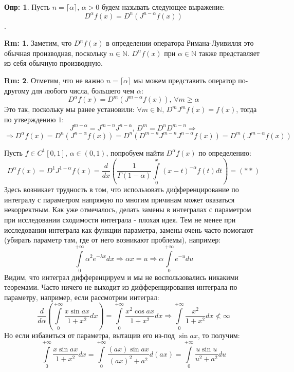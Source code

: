 \documentclass[12pt]{article}
\newcommand{\MN}{\mathbb{N}}
\theoremstyle{definition}
\newtheorem{defn}{Опр:}
\newtheorem{rem}{Rm:}
\newcommand{\ddint}[2]{\displaystyle\int\limits_{#1}^{#2}}
\begin{document}
\begin{defn}
	Пусть $n = \lceil \alpha \rceil, \, \alpha > 0$ будем называть следующее выражение:
	$$
		D^{\alpha}f(x) = D^n \left(J^{n - \alpha}f(x)\right)
	$$ 
	.
\end{defn}
\begin{rem}
	Заметим, что $D^n f(x)$ в определении оператора Римана-Луивилля это обычная производная, поскольку $n \in \MN$. $D^\alpha f(x)$ при $\alpha \in \MN$ также представляет из себя обычную производную.
\end{rem}
\begin{rem}
	Отметим, что не важно $n = \lceil \alpha \rceil$ мы можем представить оператор по-другому для любого числа, большего чем $\alpha$: 
	$$
		D^{\alpha}f(x) = D^{m}\left(J^{m - \alpha}f(x)\right), \, \forall m \geq \alpha
	$$
	Это так, поскольку мы ранее установили: $\forall m \in \MN,\, D^mJ^mf(x) = f(x)$, тогда по утверждению $1$:
	$$
		J^{m -\alpha} = J^{m -n }J^{n - \alpha}, \, D^{m} = D^{n}D^{m - n} \Rightarrow 
	$$
	$$
		\Rightarrow D^{\alpha}f(x) = D^n \left(J^{n - \alpha}f(x)\right) = D^{n}\left(D^{m -n}J^{m-n}J^{n-\alpha}f(x)\right) = D^{m}\left(J^{m - \alpha}f(x)\right)
	$$
\end{rem}
Пусть $f \in C^1[0,1], \, \alpha \in (0,1)$, попробуем найти $D^{\alpha}f(x)$ по определению:
$$
	D^{\alpha}f(x) = D^{1}J^{1 - \alpha}f(x) = \dfrac{d}{dx}\left(\dfrac{1}{\Gamma(1- \alpha)} \ddint{0}{x}(x-t)^{-\alpha}f(t)dt\right) =(**)
$$
Здесь возникает трудность в том, что использовать дифференцирование по интегралу с параметром напрямую по многим причинам может оказаться некорректным. Как уже отмечалось, делать замены в интегралах с параметром при исследовании сходимости интеграла - плохая идея. Тем не менее при исследовании интеграла как функции параметра, замены очень часто помогают (убирать параметр там, где от него возникают проблемы), например:
$$
	\ddint{0}{+\infty}\alpha^2 e^{-\lambda x} dx \Rightarrow \alpha x = u \Rightarrow \alpha \ddint{0}{+\infty} e^{-u} du
$$
Видим, что интеграл дифференцируем и мы не воспользовались никакими теоремами. Часто ничего не выходит из дифференцирования интеграла по параметру, например, если рассмотрим интеграл:
$$
	\dfrac{d}{d \alpha}\left(\ddint{0}{+\infty}\dfrac{x\sin{ax}}{1 + x^2}dx\right) = \ddint{0}{+\infty}\dfrac{x^2 \cos{ax}}{1 + x^2}dx \Rightarrow \ddint{0}{+\infty}\dfrac{x^2}{1 + x^2}dx  \not< \infty
$$
Но если избавиться от параметра, вытащив его из-под $\sin{ax}$, то получим:
$$
	\ddint{0}{+\infty}\dfrac{x\sin{ax}}{1 + x^2}dx = \ddint{0}{+\infty}\dfrac{(a x)\sin{a x}}{(ax)^2 + a^2 }d(ax) = \ddint{0}{+\infty}\dfrac{u \sin{u}}{u^2 + a^2}du
$$
\end{document}
